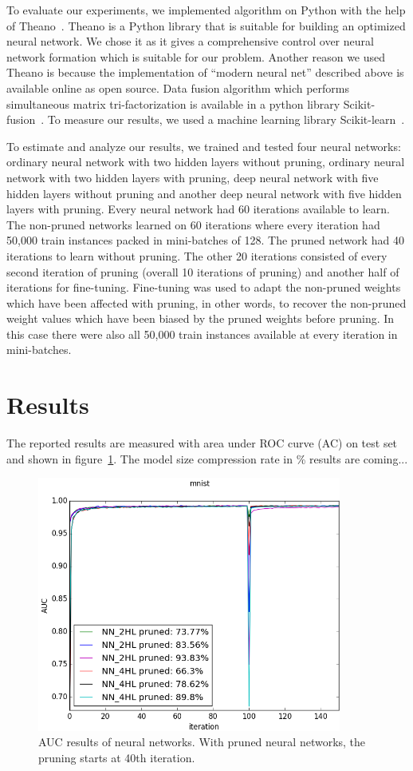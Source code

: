 \documentclass{article} %
\begin{document}
To evaluate our experiments, we implemented algorithm on Python with the help of 
Theano~\cite{Bastien-Theano-2012, bergstra+al:2010-scipy}. Theano is a Python 
library that is suitable for building an optimized neural network. We chose it 
as it gives a comprehensive control over neural network formation which is 
suitable for our problem. Another reason we used Theano is because the 
implementation of “modern neural net” described above is available online as 
open source. Data fusion algorithm which performs simultaneous matrix 
tri-factorization is available in a python library 
Scikit-fusion~\cite{zitnik2015data}. To measure our results, we used a machine 
learning library Scikit-learn~\cite{scikit-learn}. 

To estimate and analyze our results, we trained and tested four neural networks: 
ordinary neural network with two hidden layers without pruning, ordinary neural 
network with two hidden layers with pruning, deep neural network with five 
hidden layers without pruning and another deep neural network with five hidden 
layers with pruning. Every neural network had 60 iterations available to learn. 
The non-pruned networks learned on 60 iterations where every iteration had 
50,000 train instances packed in mini-batches of 128. The pruned network had 40 
iterations to learn without pruning. The other 20 iterations consisted of every 
second iteration of pruning (overall 10 iterations of pruning) and another half 
of iterations for fine-tuning. Fine-tuning was used to adapt the non-pruned 
weights which have been affected with pruning, in other words, to recover the 
non-pruned weight values which have been biased by the pruned weights before 
pruning. In this case there were also all 50,000 train instances available at 
every iteration in mini-batches.

\section{Results}
The reported results are measured with area under ROC curve (AC) on test set 
and shown in figure~\ref{f:results}. The model size compression rate in \% 
results are coming...
\begin{figure}[!ht]
\centering
\includegraphics[width=10cm]{mnist2.png}
\caption{AUC results of neural networks. With pruned neural networks, the 
pruning starts at 40th iteration.}
\label{f:results}
\end{figure}
\end{document}
